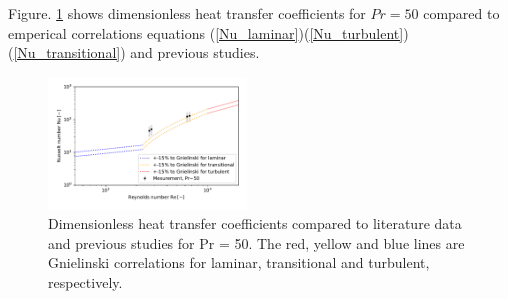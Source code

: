 \documentclass[conference]{IEEEtran}
\begin{document}
Figure. \ref{renu_pr50} shows dimensionless heat transfer coefficients for $Pr=50$ compared to emperical correlations equations (\ref{Nu_laminar})(\ref{Nu_turbulent})(\ref{Nu_transitional}) and previous studies.
\begin{figure}[htbp]
  \centering
  \vspace{5zh}
  \includegraphics[width=0.47\textwidth,natwidth=400,natheight=200]{fig/renu_pr50.pdf}
  \vspace{-1.5zh}
  \caption{Dimensionless heat transfer coefficients compared to literature data and previous studies for Pr = 50. The red, yellow and blue lines are Gnielinski correlations for laminar, transitional and turbulent, respectively.}
  \label{renu_pr50}
\end{figure}\\
\end{document}
